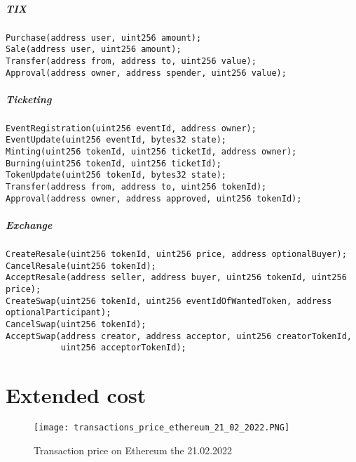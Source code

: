 \documentclass[a4paper,11pt,oneside]{report}
\begin{document}
\paragraph{TIX}
\begin{verbatim}
Purchase(address user, uint256 amount);
Sale(address user, uint256 amount);
Transfer(address from, address to, uint256 value);
Approval(address owner, address spender, uint256 value);
\end{verbatim}

\paragraph{Ticketing}
\begin{verbatim}
EventRegistration(uint256 eventId, address owner);
EventUpdate(uint256 eventId, bytes32 state);
Minting(uint256 tokenId, uint256 ticketId, address owner);
Burning(uint256 tokenId, uint256 ticketId);
TokenUpdate(uint256 tokenId, bytes32 state);
Transfer(address from, address to, uint256 tokenId);
Approval(address owner, address approved, uint256 tokenId);
\end{verbatim}

\paragraph{Exchange}
\begin{verbatim}
CreateResale(uint256 tokenId, uint256 price, address optionalBuyer);
CancelResale(uint256 tokenId);
AcceptResale(address seller, address buyer, uint256 tokenId, uint256 price);
CreateSwap(uint256 tokenId, uint256 eventIdOfWantedToken, address optionalParticipant);
CancelSwap(uint256 tokenId);
AcceptSwap(address creator, address acceptor, uint256 creatorTokenId, 
           uint256 acceptorTokenId);
\end{verbatim}

\chapter{Extended cost}
\label{sec:appendix_b}

\begin{center}
\begin{figure}[h!] 
  \texttt{[image: transactions\_price\_ethereum\_21\_02\_2022.PNG]}
  \caption{Transaction price on Ethereum the 21.02.2022}
  \label{fig:transactions_price_ethereum_21_02_2022}
\end{figure}
\end{center}
\end{document}
